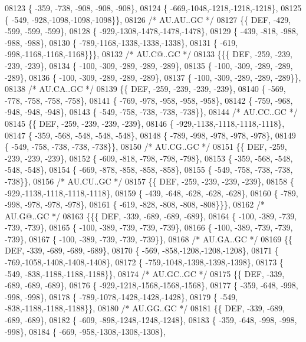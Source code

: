 \begin{DoxyCode}
08123 \{ -359, -738, -908, -908, -908\},
08124 \{ -669,-1048,-1218,-1218,-1218\},
08125 \{ -549, -928,-1098,-1098,-1098\}\},
08126 \textcolor{comment}{/* AU.AU..GC */}
08127 \{\{  DEF, -429, -599, -599, -599\},
08128 \{ -929,-1308,-1478,-1478,-1478\},
08129 \{ -439, -818, -988, -988, -988\},
08130 \{ -789,-1168,-1338,-1338,-1338\},
08131 \{ -619, -998,-1168,-1168,-1168\}\}\},
08132 \textcolor{comment}{/* AU.C@..GC */}
08133 \{\{\{  DEF, -259, -239, -239, -239\},
08134 \{ -100, -309, -289, -289, -289\},
08135 \{ -100, -309, -289, -289, -289\},
08136 \{ -100, -309, -289, -289, -289\},
08137 \{ -100, -309, -289, -289, -289\}\},
08138 \textcolor{comment}{/* AU.CA..GC */}
08139 \{\{  DEF, -259, -239, -239, -239\},
08140 \{ -569, -778, -758, -758, -758\},
08141 \{ -769, -978, -958, -958, -958\},
08142 \{ -759, -968, -948, -948, -948\},
08143 \{ -549, -758, -738, -738, -738\}\},
08144 \textcolor{comment}{/* AU.CC..GC */}
08145 \{\{  DEF, -259, -239, -239, -239\},
08146 \{ -929,-1138,-1118,-1118,-1118\},
08147 \{ -359, -568, -548, -548, -548\},
08148 \{ -789, -998, -978, -978, -978\},
08149 \{ -549, -758, -738, -738, -738\}\},
08150 \textcolor{comment}{/* AU.CG..GC */}
08151 \{\{  DEF, -259, -239, -239, -239\},
08152 \{ -609, -818, -798, -798, -798\},
08153 \{ -359, -568, -548, -548, -548\},
08154 \{ -669, -878, -858, -858, -858\},
08155 \{ -549, -758, -738, -738, -738\}\},
08156 \textcolor{comment}{/* AU.CU..GC */}
08157 \{\{  DEF, -259, -239, -239, -239\},
08158 \{ -929,-1138,-1118,-1118,-1118\},
08159 \{ -439, -648, -628, -628, -628\},
08160 \{ -789, -998, -978, -978, -978\},
08161 \{ -619, -828, -808, -808, -808\}\}\},
08162 \textcolor{comment}{/* AU.G@..GC */}
08163 \{\{\{  DEF, -339, -689, -689, -689\},
08164 \{ -100, -389, -739, -739, -739\},
08165 \{ -100, -389, -739, -739, -739\},
08166 \{ -100, -389, -739, -739, -739\},
08167 \{ -100, -389, -739, -739, -739\}\},
08168 \textcolor{comment}{/* AU.GA..GC */}
08169 \{\{  DEF, -339, -689, -689, -689\},
08170 \{ -569, -858,-1208,-1208,-1208\},
08171 \{ -769,-1058,-1408,-1408,-1408\},
08172 \{ -759,-1048,-1398,-1398,-1398\},
08173 \{ -549, -838,-1188,-1188,-1188\}\},
08174 \textcolor{comment}{/* AU.GC..GC */}
08175 \{\{  DEF, -339, -689, -689, -689\},
08176 \{ -929,-1218,-1568,-1568,-1568\},
08177 \{ -359, -648, -998, -998, -998\},
08178 \{ -789,-1078,-1428,-1428,-1428\},
08179 \{ -549, -838,-1188,-1188,-1188\}\},
08180 \textcolor{comment}{/* AU.GG..GC */}
08181 \{\{  DEF, -339, -689, -689, -689\},
08182 \{ -609, -898,-1248,-1248,-1248\},
08183 \{ -359, -648, -998, -998, -998\},
08184 \{ -669, -958,-1308,-1308,-1308\},

\end{DoxyCode}
